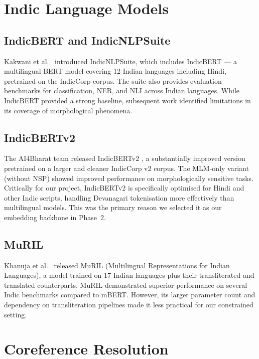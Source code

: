 \documentclass[12pt,a4paper]{report}
\begin{document}
\section{Indic Language Models}

\subsection{IndicBERT and IndicNLPSuite}

Kakwani et al.\ \cite{kakwani2020indicnlpsuite} introduced IndicNLPSuite, which includes IndicBERT --- a multilingual BERT model covering 12 Indian languages including Hindi, pretrained on the IndicCorp corpus. The suite also provides evaluation benchmarks for classification, NER, and NLI across Indian languages. While IndicBERT provided a strong baseline, subsequent work identified limitations in its coverage of morphological phenomena.

\subsection{IndicBERTv2}

The AI4Bharat team released IndicBERTv2 \cite{doddapaneni2023indicbert}, a substantially improved version pretrained on a larger and cleaner IndicCorp v2 corpus. The MLM-only variant (without NSP) showed improved performance on morphologically sensitive tasks. Critically for our project, IndicBERTv2 is specifically optimised for Hindi and other Indic scripts, handling Devanagari tokenisation more effectively than multilingual models. This was the primary reason we selected it as our embedding backbone in Phase~2.

\subsection{MuRIL}

Khanuja et al.\ \cite{khanuja2021muril} released MuRIL (Multilingual Representations for Indian Languages), a model trained on 17 Indian languages plus their transliterated and translated counterparts. MuRIL demonstrated superior performance on several Indic benchmarks compared to mBERT. However, its larger parameter count and dependency on transliteration pipelines made it less practical for our constrained setting.

\section{Coreference Resolution}
\end{document}
